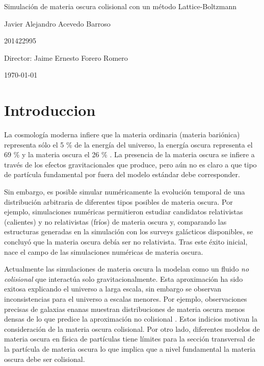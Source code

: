 \documentclass[12pt]{article}
\begin{document}
\begin{center}
\Huge
Simulación de materia oscura colisional con un método Lattice-Boltzmann

\vspace{3mm}
\Large Javier Alejandro Acevedo Barroso

\large
201422995


\vspace{2mm}
\Large
Director: Jaime Ernesto Forero Romero

\normalsize
\vspace{2mm}

\today
\end{center}


\normalsize
\newpage
\section{Introduccion}
La cosmología moderna infiere que la materia ordinaria (materia
bariónica) representa s\'olo el 5 \% de la energía del universo, la
energía oscura representa el 69 \% y la materia oscura el 26 \%
\cite{planckCitetion}.   
La presencia de la materia oscura se infiere a trav\'es de los efectos
gravitacionales que produce, pero a\'un no es claro a que tipo de
part\'icula fundamental por fuera del modelo est\'andar debe
corresponder. 

Sin embargo, es posible simular numéricamente la evoluci\'on temporal
de una distribuci\'on arbitraria de diferentes tipos posibles de
materia oscura. 
Por ejemplo,  simulaciones numéricas permitieron estudiar candidatos
relativistas (calientes) y no relativistas (fríos) de materia oscura
y, comparando las estructuras generadas en la simulación con los
surveys galácticos disponibles, se concluyó que la materia oscura
debía ser no relativista. Tras este éxito inicial, nace el campo de
las simulaciones numéricas de materia oscura.\cite{aHistory}  

Actualmente las simulaciones de materia oscura la modelan 
como un fluido \emph{no colisional} que interact\'ua solo gravitacionalmente. 
Esta aproximaci\'on ha sido exitosa explicando el universo a larga
escala, sin embargo se observan inconsistencias para el universo a
escalas menores. 
Por ejemplo, observaciones precisas de galaxias enanas muestran distribuciones
de materia oscura menos densas de lo que predice la aproximaci\'on no
colisional \cite{beyondColl}.
Estos indicios motivan la consideraci\'on de la materia oscura
colisional. 
Por otro lado,  diferentes modelos de materia oscura en física de
partículas tiene límites para la sección transversal de la partícula
de materia oscura lo que implica que a nivel fundamental la materia
oscura debe ser colisional.
\end{document}
